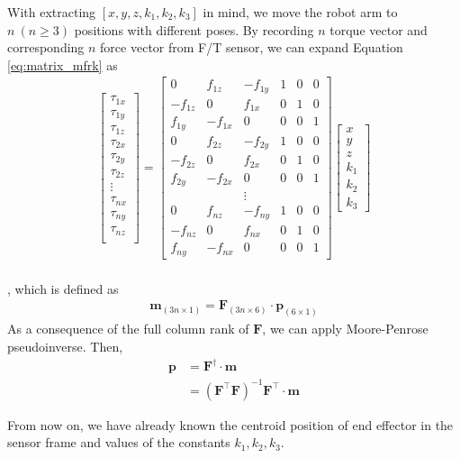 With extracting $[x,y,z,k_1,k_2,k_3]$ in mind, we move the robot arm to $n\ (n\geq3)$ positions with different poses. By recording $n$ torque vector and corresponding $n$ force vector from F/T sensor, we can expand Equation \ref{eq:matrix_mfrk} as
\begin{equation}
\begin{split}
\begin{bmatrix}
\tau _{1x}\\
\tau _{1y}\\
\tau _{1z}\\
\tau _{2x}\\
\tau _{2y}\\
\tau _{2z}\\
\vdots\\
\tau _{nx}\\
\tau _{ny}\\
\tau _{nz}\\
\end{bmatrix}
=
\begin{bmatrix}
0			&f_{1z}		&-f_{1y}	&1	&0	&0\\
-f_{1z}		&0			&f_{1x}		&0	&1	&0\\
f_{1y}		&-f_{1x}	&0			&0	&0	&1\\
0			&f_{2z}		&-f_{2y}	&1	&0	&0\\
-f_{2z}		&0			&f_{2x}		&0	&1	&0\\
f_{2y}		&-f_{2x}	&0			&0	&0	&1\\
 			& 			&\vdots		& 	& 	& \\
0			&f_{nz}		&-f_{ny}	&1	&0	&0\\
-f_{nz}		&0			&f_{nx}		&0	&1	&0\\
f_{ny}		&-f_{nx}	&0			&0	&0	&1
\end{bmatrix}
\begin{bmatrix}
x\\
y\\
z\\
k_1\\
k_2\\
k_3
\end{bmatrix}\\
\end{split}
\end{equation}
\par
, which is defined as 
\begin{equation}
\begin{split}
\boldsymbol{m}_{\left(3n \times 1\right)} = \mathbf{F}_{\left(3n \times 6\right)} \cdot \boldsymbol{p}_{\left(6 \times 1\right)}
\end{split}
\end{equation}
As a consequence of the full column rank of $\mathbf{F}$, we can apply Moore-Penrose pseudoinverse. Then, 
\begin{equation*}
\begin{split}
\boldsymbol{p} 	&= \mathbf{F}^{\dagger} \cdot \boldsymbol{m}\\
				&= \left( \mathbf{F}^\top\mathbf{F}\right) ^{-1}\mathbf{F}^\top \cdot \boldsymbol{m}
\end{split}
\end{equation*}
\par
From now on, we have already known the centroid position of end effector in the sensor frame and values of the constants $k_1,k_2,k_3$.
